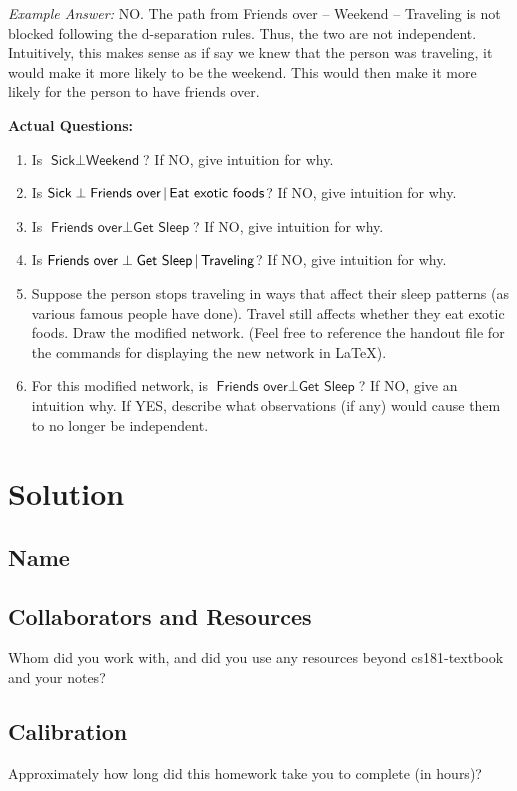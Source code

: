 \documentclass[submit]{harvardml}
\newcommand{\attr}[1]{\textsf{#1}}
\begin{document}
\begin{problem}
\textit{Example Answer:} NO. The path from Friends over -- Weekend -- Traveling is not blocked following the d-separation rules. Thus, the two are not independent. Intuitively, this makes sense as if say we knew that the person was traveling, it would make it more likely to be the weekend. This would then make it more likely for the person to have friends over.

\textbf{Actual Questions:}

\begin{enumerate}
\item Is $\attr{Sick} \perp \attr{Weekend}$?
  If NO, give intuition for why.


\item Is $\attr{Sick} \perp \attr{Friends over}\given \attr{Eat exotic
  foods}$? If NO, give intuition for why.


\item Is $\attr{Friends over} \perp \attr{Get Sleep}$? If NO, give
  intuition for why.

\item Is $\attr{Friends over} \perp \attr{Get Sleep} \given
  \attr{Traveling}$? If NO, give intuition for why.

\item Suppose the person stops traveling in ways that affect their
  sleep patterns (as various famous people have done).  Travel still
  affects whether they eat exotic foods.  Draw the modified network. (Feel free to reference the handout file for the commands for displaying the new network in \LaTeX).

\item For this modified network, is $\attr{Friends over} \perp
  \attr{Get Sleep}$? If NO, give an intuition why.  If YES,
  describe what observations (if any) would cause them to no longer be
  independent.

\end{enumerate}
\end{problem}


\section*{Solution}


\newpage
\subsection*{Name}

\subsection*{Collaborators and Resources}
Whom did you work with, and did you use any resources beyond cs181-textbook and your notes?

\subsection*{Calibration}
Approximately how long did this homework take you to complete (in hours)? 
\end{document}
